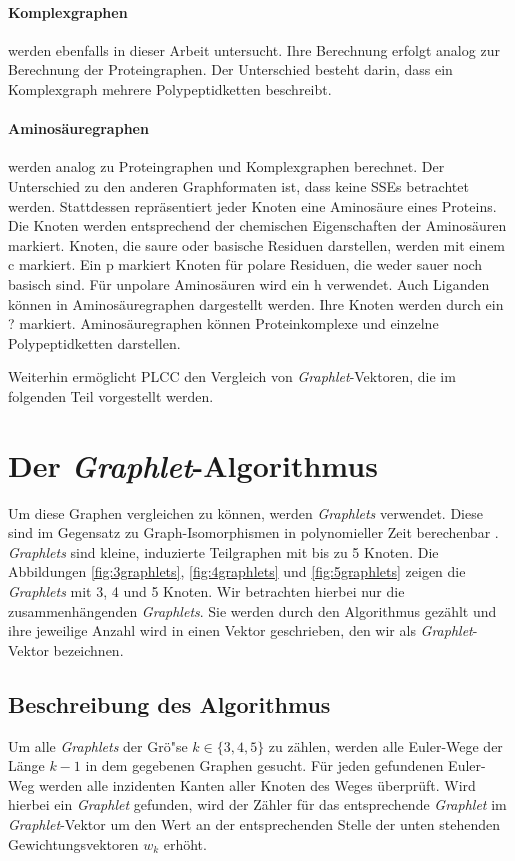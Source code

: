 \documentclass{report}
\begin{document}
\paragraph{Komplexgraphen}

werden ebenfalls in dieser Arbeit untersucht. Ihre Berechnung erfolgt analog zur Berechnung der Proteingraphen. Der Unterschied besteht darin, dass ein Komplexgraph mehrere Polypeptidketten beschreibt.

\paragraph{Aminos\"auregraphen} werden analog zu Proteingraphen und Komplexgraphen berechnet. Der Unterschied zu den anderen Graphformaten ist, dass keine SSEs betrachtet werden. Stattdessen repr\"asentiert jeder Knoten eine Aminos\"aure eines Proteins. Die Knoten werden entsprechend der chemischen Eigenschaften der Aminos\"auren markiert. Knoten, die saure oder basische Residuen darstellen, werden mit einem c markiert. Ein p markiert Knoten f\"ur polare Residuen, die weder sauer noch basisch sind. F\"ur unpolare Aminos\"auren wird ein h verwendet. Auch Liganden k\"onnen in Aminos\"auregraphen dargestellt werden. Ihre Knoten werden durch ein ? markiert. Aminos\"auregraphen k\"onnen Proteinkomplexe und einzelne Polypeptidketten darstellen.


Weiterhin erm\"oglicht PLCC den Vergleich von \textit{Graphlet}-Vektoren, die im folgenden Teil vorgestellt werden.


\section{Der \textit{Graphlet}-Algorithmus}


Um diese Graphen vergleichen zu k\"onnen, werden \textit{Graphlets} verwendet. Diese sind im Gegensatz zu Graph-Isomorphismen in polynomieller Zeit berechenbar \cite{sherv_graphlets}. \textit{Graphlets} sind kleine, induzierte Teilgraphen mit bis zu 5 Knoten. Die Abbildungen \ref{fig:3graphlets}, \ref{fig:4graphlets} und \ref{fig:5graphlets} zeigen die \textit{Graphlets} mit 3, 4 und 5 Knoten. Wir betrachten hierbei nur die zusammenh\"angenden \textit{Graphlets}. Sie werden durch den Algorithmus gez\"ahlt und ihre jeweilige Anzahl wird in einen Vektor geschrieben, den wir als \textit{Graphlet}-Vektor bezeichnen.


\subsection{Beschreibung des Algorithmus}
Um alle \textit{Graphlets} der Gr\"o"se $k \in \{3,4,5\}$ zu z\"ahlen, werden alle Euler-Wege der L\"ange $k-1$ in dem gegebenen Graphen gesucht. F\"ur jeden gefundenen Euler-Weg werden alle inzidenten Kanten aller Knoten des Weges \"uberpr\"uft. Wird hierbei ein \textit{Graphlet} gefunden, wird der Z\"ahler f\"ur das entsprechende \textit{Graphlet} im \textit{Graphlet}-Vektor um den Wert an der entsprechenden Stelle der unten stehenden Gewichtungsvektoren $w_k$ erh\"oht.
\end{document}
